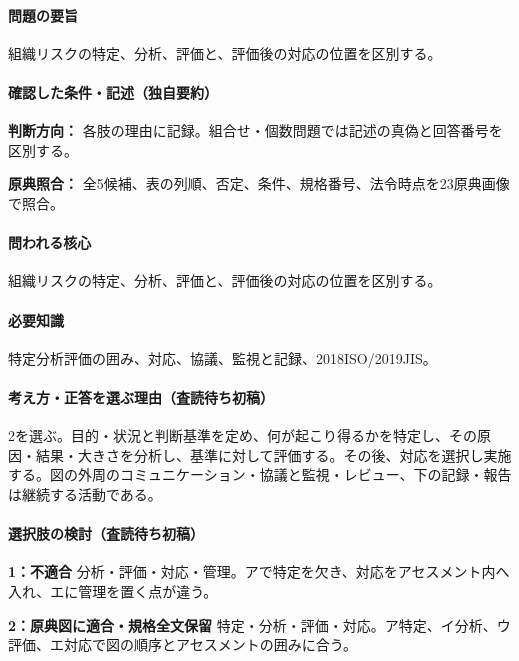 \paragraph{問題の要旨} 組織リスクの特定、分析、評価と、評価後の対応の位置を区別する。

\paragraph{確認した条件・記述（独自要約）}\mbox{}\par

\noindent\textbf{判断方向：} 各肢の理由に記録。組合せ・個数問題では記述の真偽と回答番号を区別する。\par

\noindent\textbf{原典照合：} 全5候補、表の列順、否定、条件、規格番号、法令時点を23原典画像で照合。\par

\paragraph{問われる核心} 組織リスクの特定、分析、評価と、評価後の対応の位置を区別する。

\paragraph{必要知識} 特定分析評価の囲み、対応、協議、監視と記録、2018ISO/2019JIS。

\paragraph{考え方・正答を選ぶ理由（査読待ち初稿）} 2を選ぶ。目的・状況と判断基準を定め、何が起こり得るかを特定し、その原因・結果・大きさを分析し、基準に対して評価する。その後、対応を選択し実施する。図の外周のコミュニケーション・協議と監視・レビュー、下の記録・報告は継続する活動である。

\paragraph{選択肢の検討（査読待ち初稿）}\mbox{}\par

\noindent\textbf{1：不適合} 分析・評価・対応・管理。アで特定を欠き、対応をアセスメント内へ入れ、エに管理を置く点が違う。\par

\noindent\textbf{2：原典図に適合・規格全文保留} 特定・分析・評価・対応。ア特定、イ分析、ウ評価、エ対応で図の順序とアセスメントの囲みに合う。\par

